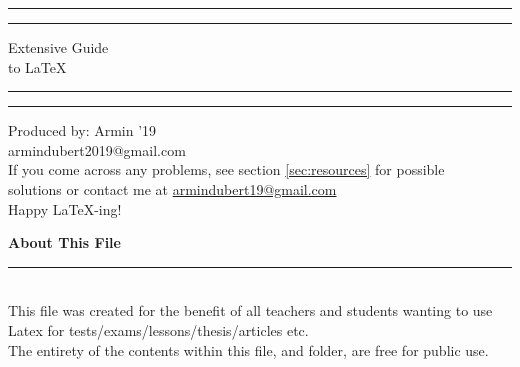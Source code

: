 \documentclass[12pt,hidelinks]{article}
\begin{document}
\begin{titlepage}
	\centering %
	\scshape %
	\vspace*{1.5\baselineskip} %

	\rule{13cm}{1.6pt}\vspace*{-\baselineskip}\vspace*{2pt} %
	\rule{13cm}{0.4pt} %
	
		\vspace{0.75\baselineskip} %
	{	\Huge Extensive Guide\\ 
			\vspace{4mm}
		to \LaTeX \\	}
		\vspace{0.75\baselineskip} %
	\rule{13cm}{0.4pt}\vspace*{-\baselineskip}\vspace{3.2pt} %
	\rule{13cm}{1.6pt} %
	
		\vspace{1.75\baselineskip} %
	{\large Produced by: Armin '19 \\
		\vspace*{1.2\baselineskip}
	armindubert2019@gmail.com} \\
	\vfill
If you come across any problems, see section \ref{sec:resources} for possible\\ \vspace{1mm}
solutions or contact me at \url{armindubert19@gmail.com}\\ \vspace{1mm}
Happy \LaTeX-ing!
\end{titlepage}
\tableofcontents
\vfill
\small{\noindent \textbf{About This File} \vspace{-3mm}\\
\noindent \rule{3.3cm}{0.5pt} \\
This file was created for the benefit of all teachers and students wanting to use Latex for tests/exams/lessons/thesis/articles etc.\\
The entirety of the contents within this file, and folder, are free for public use.}
\newpage
{}
\end{document}
